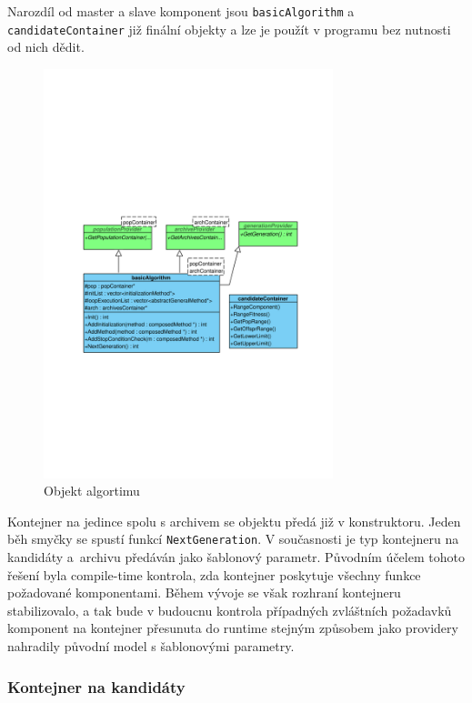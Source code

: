 Narozdíl od master a slave komponent jsou \texttt{basicAlgorithm} a \texttt{candidateContainer} již finální objekty a lze je použít v programu bez nutnosti od nich dědit.

\begin{figure}[h!]
\begin{center}
  \includegraphics[width=0.75\textwidth]{img/population}
  \caption{Objekt algortimu}\label{population}
  \end{center}
\end{figure}

Kontejner na jedince spolu s archivem se objektu předá již v konstruktoru. Jeden běh smyčky se spustí funkcí \texttt{NextGeneration}. V současnosti je typ kontejneru na kandidáty a~archivu předáván jako šablonový parametr. Původním účelem tohoto řešení byla compile-time kontrola, zda kontejner poskytuje všechny funkce požadované komponentami. Během vývoje se však rozhraní kontejneru stabilizovalo, a tak bude v budoucnu kontrola případných zvláštních požadavků komponent na kontejner přesunuta do runtime stejným způsobem jako providery nahradily původní model s šablonovými parametry.

\subsubsection{Kontejner na kandidáty}


